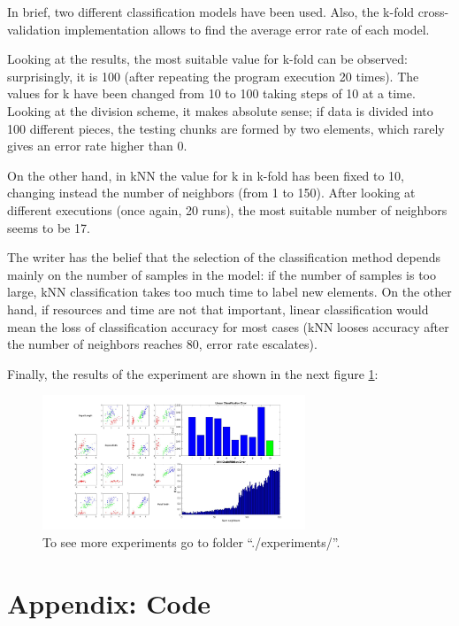 \documentclass[11pt]{article}
\begin{document}
In brief, two different classification models have been used. Also,
the k-fold cross-validation implementation allows to find the average error rate
of each model.

Looking at the results, the most suitable value for k-fold can be observed: 
surprisingly, it is 100 (after repeating the program execution 20 times). 
The values for k have been changed from 10 to 100 taking steps of 10 at a time. 
Looking at the division scheme, it makes absolute sense; if data is divided into 
100 different pieces, the testing chunks are formed by two elements, which 
rarely gives an error rate higher than 0.

On the other hand, in kNN the value for k in k-fold has been fixed to 10,
changing instead the number of neighbors (from 1 to 150). After looking at 
different executions (once again, 20 runs), the most suitable number of 
neighbors seems to be 17.

The writer has the belief that the selection of the classification method 
depends mainly on the number of samples in the model: if the number of samples 
is too large, kNN classification takes too much time to label new elements. 
On the other hand, if resources and time are not that important, linear 
classification would mean the loss of classification accuracy for most cases 
(kNN looses accuracy after the number of neighbors reaches 80, error rate
escalates).

Finally, the results of the experiment are shown in the next figure
\hyperref[exp]{\ref{exp}}:

\begin{figure}[h]
 \centering
 \includegraphics[width=0.7\textwidth]{../experiments/estimation.jpg}
 \caption{To see more experiments go to folder ``./experiments/''.}
 \label{exp}
\end{figure}

\newpage

\section*{Appendix: Code}
\end{document}
